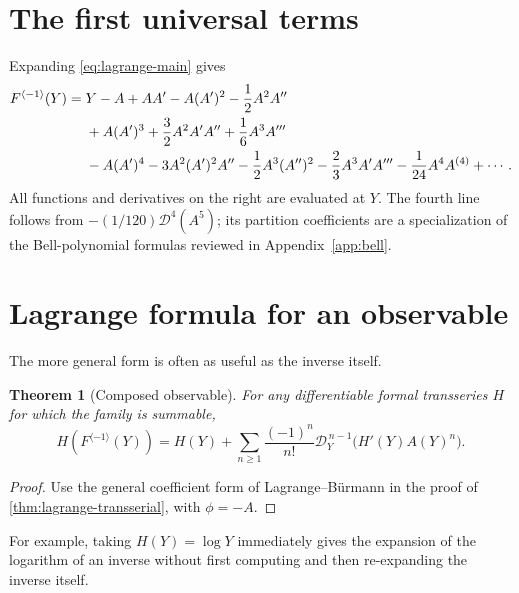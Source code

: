 \documentclass[11pt,oneside]{book}
\newtheorem{theorem}{Theorem}[chapter]
\theoremstyle{definition}
\theoremstyle{remark}
\newcommand{\D}{\mathcal D}
\newcommand{\compinv}{^{\langle-1\rangle}}
\begin{document}
\section{The first universal terms}
Expanding \eqref{eq:lagrange-main} gives
\begin{align}
 F\compinv(Y)={}&Y-A+AA'
 -A(A')^2-\frac12A^2A''\notag\\
 &+A(A')^3+\frac32A^2A'A''+\frac16A^3A'''\notag\\
 &-A(A')^4-3A^2(A')^2A''-\frac12A^3(A'')^2
 -\frac23A^3A'A'''-\frac1{24}A^4A^{(4)}+\cdots.
 \label{eq:lagrange-first-terms}
\end{align}
All functions and derivatives on the right are evaluated at $Y$.  The fourth
line follows from $-(1/120)\D^4(A^5)$; its partition coefficients are a
specialization of the Bell-polynomial formulas reviewed in
Appendix~\ref{app:bell}.

\section{Lagrange formula for an observable}
The more general form is often as useful as the inverse itself.

\begin{theorem}[Composed observable]
For any differentiable formal transseries $H$ for which the family is
summable,
\begin{equation}\label{eq:lagrange-observable}
 H(F\compinv(Y))
 =H(Y)+\sum_{n\ge1}\frac{(-1)^n}{n!}
 \D_Y^{\,n-1}\bigl(H'(Y)A(Y)^n\bigr).
\end{equation}
\end{theorem}
\begin{proof}
Use the general coefficient form of Lagrange--B\"urmann in the proof of
\cref{thm:lagrange-transserial}, with $\phi=-A$.
\end{proof}

For example, taking $H(Y)=\log Y$ immediately gives the expansion of the
logarithm of an inverse without first computing and then re-expanding the
inverse itself.
\end{document}

